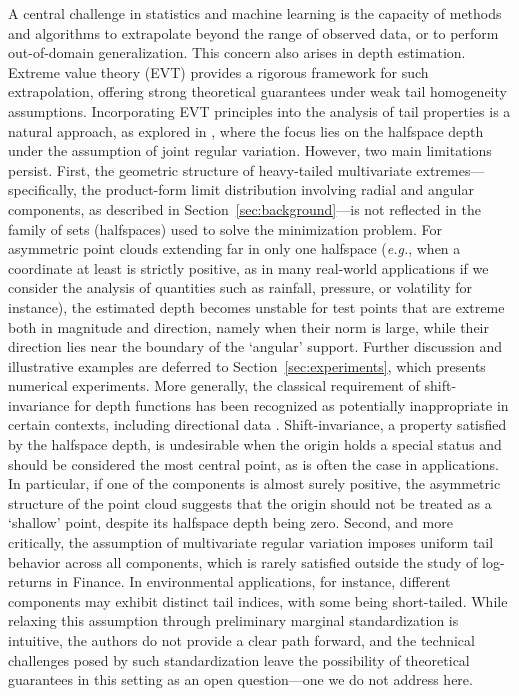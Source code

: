 \documentclass{article}
\numberwithin{equation}{section}
\begin{document}
\par A central challenge in statistics and machine learning is the
capacity of methods and algorithms to extrapolate beyond the range of
observed data, or to perform out-of-domain generalization. This
concern also arises in depth estimation. Extreme value theory (EVT)
provides a rigorous framework for such extrapolation, offering strong
theoretical guarantees under weak tail homogeneity assumptions.
Incorporating EVT principles into the analysis of tail properties is
a natural approach, as explored in
\cite{einmahl2015bridging,he2017estimation}, where the focus lies on
the halfspace depth under the assumption of joint regular variation.
However, two main limitations persist.
First, the geometric structure of heavy-tailed multivariate
extremes---specifically, the product-form limit distribution
involving radial and angular components, as described in
Section~\ref{sec:background}---is not reflected in the family of sets
(halfspaces) used to solve the minimization problem. For asymmetric
point clouds extending far in only one halfspace (\textit{e.g.}, when a coordinate at least is strictly positive, as in many real-world applications if we consider the analysis of quantities such as rainfall, pressure, or volatility for instance), the estimated depth
becomes unstable for test points that are extreme both in magnitude
and direction, namely when their norm is large,  while their
direction lies near the boundary of the `angular' support. Further
discussion and illustrative examples are deferred to
Section~\ref{sec:experiments}, which presents numerical experiments.
More generally, the classical requirement of shift-invariance for
depth functions has been recognized as potentially inappropriate in
certain contexts, including directional data
\cite{NagyDemniButtarazziPorzio2023,nagy2024theoretical}.
Shift-invariance, a property satisfied by the halfspace depth, is
undesirable when the origin holds a special status and should be
considered the most central point, as is often the case in
applications. In particular, if one of the components is almost
surely positive, the asymmetric structure of the point cloud suggests
that the origin should not be treated as a `shallow' point, despite
its halfspace depth being zero.
Second, and more critically, the assumption of multivariate regular
variation imposes uniform tail behavior across all components, which
is rarely satisfied outside the study of log-returns in Finance. In
environmental applications, for instance, different components may
exhibit distinct tail indices, with some being short-tailed. While
relaxing this assumption through preliminary marginal standardization
is intuitive, the authors do not provide a clear path forward, and
the technical challenges posed by such standardization leave the
possibility of theoretical guarantees in this setting as an open
question---one we do not address here.
\end{document}
